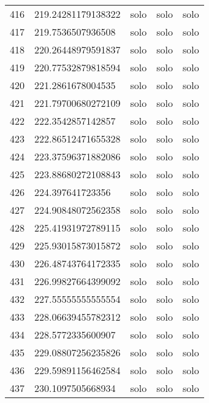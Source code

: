 \begin{table}[]
\begin{tabular}{lllll}
    416  & 219.24281179138322 & solo         & solo            & solo           \\
    417  & 219.7536507936508  & solo         & solo            & solo           \\
    418  & 220.26448979591837 & solo         & solo            & solo           \\
    419  & 220.77532879818594 & solo         & solo            & solo           \\
    420  & 221.2861678004535  & solo         & solo            & solo           \\
    421  & 221.79700680272109 & solo         & solo            & solo           \\
    422  & 222.3542857142857  & solo         & solo            & solo           \\
    423  & 222.86512471655328 & solo         & solo            & solo           \\
    424  & 223.37596371882086 & solo         & solo            & solo           \\
    425  & 223.88680272108843 & solo         & solo            & solo           \\
    426  & 224.397641723356   & solo         & solo            & solo           \\
    427  & 224.90848072562358 & solo         & solo            & solo           \\
    428  & 225.41931972789115 & solo         & solo            & solo           \\
    429  & 225.93015873015872 & solo         & solo            & solo           \\
    430  & 226.48743764172335 & solo         & solo            & solo           \\
    431  & 226.99827664399092 & solo         & solo            & solo           \\
    432  & 227.55555555555554 & solo         & solo            & solo           \\
    433  & 228.06639455782312 & solo         & solo            & solo           \\
    434  & 228.5772335600907  & solo         & solo            & solo           \\
    435  & 229.08807256235826 & solo         & solo            & solo           \\
    436  & 229.59891156462584 & solo         & solo            & solo           \\
    437  & 230.1097505668934  & solo         & solo            & solo           \\

\end{tabular}
\end{table}
